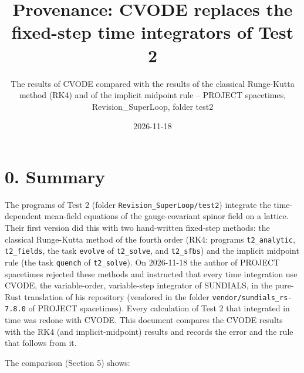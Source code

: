 \documentclass[
  10pt,
]{article}
\title{Provenance: CVODE replaces the fixed-step time integrators of
Test 2}
\subtitle{The results of CVODE compared with the results of the
classical Runge-Kutta method (RK4) and of the implicit midpoint rule --
PROJECT spacetimes, Revision\_SuperLoop, folder test2}
\author{}
\date{2026-11-18}
\begin{document}
\maketitle

\hypertarget{summary}{%
\section{0. Summary}\label{summary}}

The programs of Test 2 (folder \texttt{Revision\_SuperLoop/test2})
integrate the time-dependent mean-field equations of the gauge-covariant
spinor field on a lattice. Their first version did this with two
hand-written fixed-step methods: the classical Runge-Kutta method of the
fourth order (RK4: programs \texttt{t2\_analytic}, \texttt{t2\_fields},
the task \texttt{evolve} of \texttt{t2\_solve}, and \texttt{t2\_sfbs})
and the implicit midpoint rule (the task \texttt{quench} of
\texttt{t2\_solve}). On 2026-11-18 the author of PROJECT spacetimes
rejected these methods and instructed that every time integration use
CVODE, the variable-order, variable-step integrator of SUNDIALS, in the
pure-Rust translation of his repository (vendored in the folder
\texttt{vendor/sundials\_rs-7.8.0} of PROJECT spacetimes). Every
calculation of Test 2 that integrated in time was redone with CVODE.
This document compares the CVODE results with the RK4 (and
implicit-midpoint) results and records the error and the rule that
follows from it.

The comparison (Section 5) shows:
\end{document}
